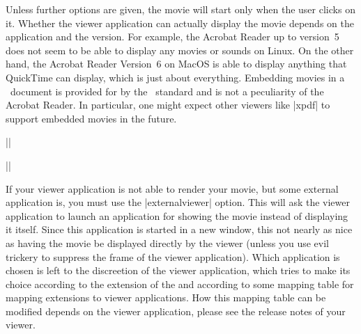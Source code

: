 \begin{command}{\movie{}}
  Unless further options are given, the movie will start only when the
  user clicks on it. Whether the viewer application can actually
  display the movie depends on the application and the version. For
  example, the Acrobat Reader up to version~5 does not seem to be able
  to display any movies or sounds on Linux. On the other hand, the
  Acrobat Reader Version~6 on MacOS is able to display anything that
  QuickTime can display, which is just about everything. Embedding
  movies in a \pdf\ document is provided for by the \pdf\ standard and
  is not a peculiarity of the Acrobat Reader. In particular, one might
  expect other viewers like |xpdf| to support embedded movies in the
  future.

  \example
  ||

  \example
  ||

  If your viewer application is not able to render your movie, but
  some external application is, you must use the |externalviewer|
  option. This will ask the viewer application to launch an
  application for showing the movie instead of displaying it
  itself. Since this application is started in a new window, this not
  nearly as nice as having the movie be displayed directly by the
  viewer (unless you use evil trickery to suppress the frame of the
  viewer application). Which application is chosen is left to the
  discreetion of the viewer application, which tries to make its
  choice according to the extension of the  and
  according to some mapping table for mapping extensions 
  to viewer applications. How this mapping table can be modified
  depends on the viewer application, please see the release notes of
  your viewer.
  

\end{command}
